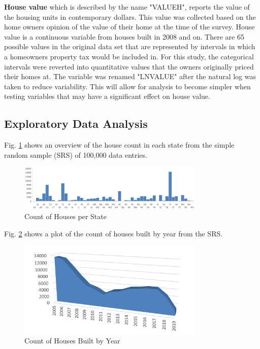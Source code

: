 \indent \textbf{House value} which is described by the name "VALUEH", reports the value of the housing units in contemporary dollars. This value was collected based on the home owners opinion of the value of their home at the time of the survey. House value is a continuous variable from houses built in 2008 and on. There are 65 possible values in the original data set that are represented by intervals in which a homeowners property tax would be included in.\cite{IPUMS} For this study, the categorical intervals were reverted into quantitative values that the owners originally priced their homes at. The variable was renamed "LNVALUE" after the natural log was taken to reduce variability. This will allow for analysis to become simpler when testing variables that may have a significant effect on house value.


\subsection{Exploratory Data Analysis}

Fig. \ref{figure:state_counts} shows an overview of the house count in each state from the simple random sample (SRS) of 100,000 data entries.

\begin{figure}[h!]
	\centering
	\includegraphics[width=3.5in]{./fig/State_Counts.PNG}
	\caption{Count of Houses per State}
	\label{figure:state_counts}
\end{figure}

Fig. \ref{figure:year_counts} shows a plot of the count of houses built by year from the SRS.

\begin{figure}[h!]
	\centering
	\includegraphics[width=3.5in]{./fig/Year_Counts.PNG}
	\caption{Count of Houses Built by Year}
	\label{figure:year_counts}
\end{figure}

